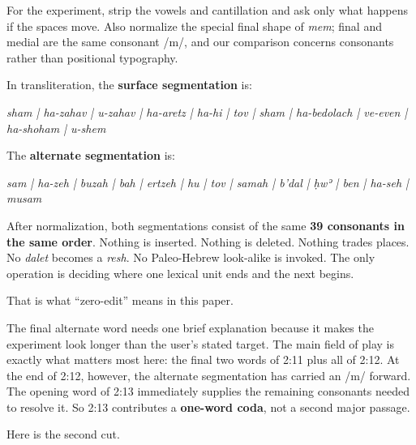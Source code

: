 For the experiment, strip the vowels and cantillation and ask only what happens if the spaces move. Also normalize the special final shape of \textit{mem}; final  and medial  are the same consonant /m/, and our comparison concerns consonants rather than positional typography.

In transliteration, the \textbf{surface segmentation} is:

\textit{sham | ha-zahav | u-zahav | ha-aretz | ha-hi | tov | sham | ha-bedolach | ve-even | ha-shoham | u-shem}

The \textbf{alternate segmentation} is:

\textit{sam | ha-zeh | buzah | bah | ertzeh | hu | tov | samah | b'dal | ḥwʾ | ben | ha-seh | musam}

After normalization, both segmentations consist of the same \textbf{39 consonants in the same order}. Nothing is inserted. Nothing is deleted. Nothing trades places. No \textit{dalet} becomes a \textit{resh}. No Paleo-Hebrew look-alike is invoked. The only operation is deciding where one lexical unit ends and the next begins.

That is what ``zero-edit'' means in this paper.

The final alternate word needs one brief explanation because it makes the experiment look longer than the user's stated target. The main field of play is exactly what matters most here: the final two words of 2:11 plus all of 2:12. At the end of 2:12, however, the alternate segmentation has carried an /m/ forward. The opening word of 2:13 immediately supplies the remaining consonants needed to resolve it. So 2:13 contributes a \textbf{one-word coda}, not a second major passage.

Here is the second cut.

